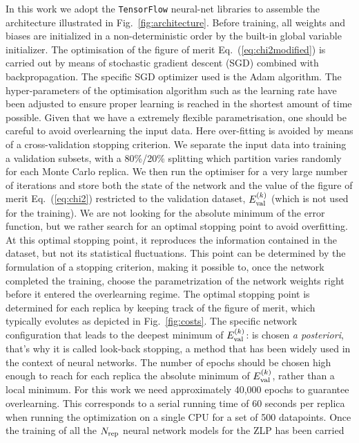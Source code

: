 In this work we adopt the {\tt TensorFlow} neural-net libraries to assemble
the architecture illustrated in Fig.~\ref{fig:architecture}.
%
Before training, all weights and biases are initialized in a non-deterministic order
by the built-in global variable initializer. 
%
The optimisation of the figure of merit Eq.~(\ref{eq:chi2modified}) is carried
out by means of stochastic gradient descent (SGD) combined with backpropagation. The
specific SGD optimizer used is the Adam algorithm.
%
The hyper-parameters of the optimisation algorithm such as the learning rate
have been adjusted to ensure proper learning is reached in the shortest amount
of time possible.
%
Given that we have a extremely flexible parametrisation, one should be careful
to avoid overlearning the input data.
%
Here over-fitting is avoided by means of a cross-validation stopping criterion.
%
We separate the input data into training a validation subsets, with a 80\%/20\% splitting
which partition varies randomly for each Monte Carlo replica.
%
We then run the optimiser for a very large number of iterations and store both
the state of the network and the value
of the figure of merit Eq.~(\ref{eq:chi2}) restricted to the validation
dataset, $E^{(k)}_{\rm val}$ (which is not used for the training).
%
We are not looking for the absolute minimum of the error function, 
but we rather search for an optimal stopping point to avoid overfitting. 
%
At this optimal stopping point, it reproduces the information contained in the dataset, 
but not its statistical fluctuations.
%
This point can be determined by the formulation of a stopping criterion, 
making it possible to, once the network completed the training, 
choose the parametrization of the network weights right before it 
entered the overlearning regime. 
%
The optimal stopping point is determined  for each replica
by keeping track of the figure of merit, which typically evolutes
as depicted in Fig.~\ref{fig:costs}. 
%
The specific network configuration that leads to the deepest minimum of $E^{(k)}_{\rm val}$:
is chosen {\it a posteriori}, that's why it is called look-back stopping, 
a method that has been widely used in the context
of neural networks.
%
The number of epochs should be chosen high enough to reach for each replica 
the absolute minimum of $E^{(k)}_{\rm val}$, 
rather than a local minimum.
For this work we need approximately 40,000 epochs to guarantee overlearning.
%
This corresponds to a serial running time of 60 seconds per replica when running the optimization on a 
single CPU for a set of 500 datapoints.
%
Once the training of all the $N_{\rm rep}$ neural network models for the ZLP has been carried
